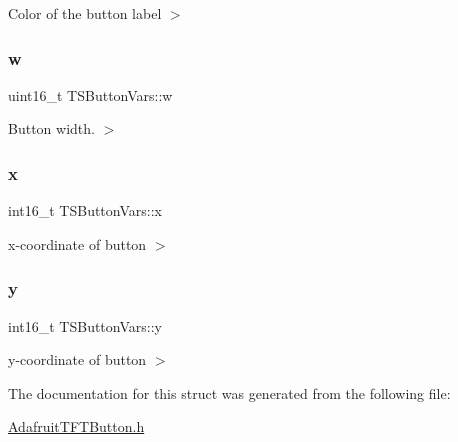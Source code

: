 Color of the button label $>$ \mbox{\label{struct_t_s_button_vars_afee576f3d2c40433495e7e26fe49ebee}} 
\subsubsection{\texorpdfstring{w}{w}}
{\footnotesize\ttfamily uint16\+\_\+t T\+S\+Button\+Vars\+::w}

Button width. $>$ \mbox{\label{struct_t_s_button_vars_adabcf574daf6ec1fae86877a1d4ca008}} 
\subsubsection{\texorpdfstring{x}{x}}
{\footnotesize\ttfamily int16\+\_\+t T\+S\+Button\+Vars\+::x}

x-\/coordinate of button $>$ \mbox{\label{struct_t_s_button_vars_af8786da14bcada953f31f2399fe6d20a}} 
\subsubsection{\texorpdfstring{y}{y}}
{\footnotesize\ttfamily int16\+\_\+t T\+S\+Button\+Vars\+::y}

y-\/coordinate of button $>$ 

The documentation for this struct was generated from the following file\+:\begin{DoxyCompactItemize}
\item 
\mbox{\hyperlink{_adafruit_t_f_t_button_8h}{Adafruit\+T\+F\+T\+Button.\+h}}\end{DoxyCompactItemize}

